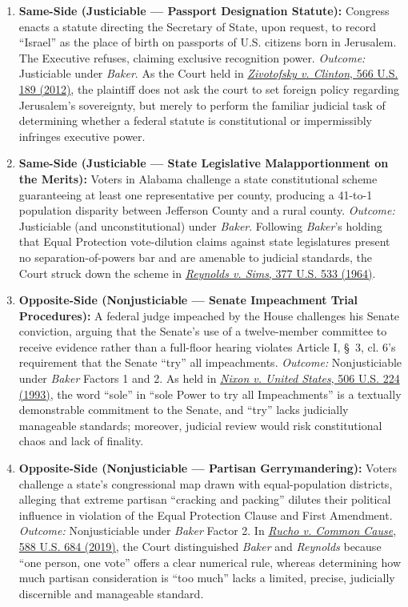 \documentclass[12pt]{article}
\begin{document}
\begin{enumerate}
  \item \textbf{Same-Side (Justiciable --- Passport Designation Statute):} Congress enacts a statute directing the Secretary of State, upon request, to record ``Israel'' as the place of birth on passports of U.S. citizens born in Jerusalem. The Executive refuses, claiming exclusive recognition power. \textit{Outcome:} Justiciable under \textit{Baker}. As the Court held in \href{https://supreme.justia.com/cases/federal/us/566/189/}{\textit{Zivotofsky v. Clinton}, 566 U.S. 189 (2012)}, the plaintiff does not ask the court to set foreign policy regarding Jerusalem's sovereignty, but merely to perform the familiar judicial task of determining whether a federal statute is constitutional or impermissibly infringes executive power.

  \item \textbf{Same-Side (Justiciable --- State Legislative Malapportionment on the Merits):} Voters in Alabama challenge a state constitutional scheme guaranteeing at least one representative per county, producing a 41-to-1 population disparity between Jefferson County and a rural county. \textit{Outcome:} Justiciable (and unconstitutional) under \textit{Baker}. Following \textit{Baker}'s holding that Equal Protection vote-dilution claims against state legislatures present no separation-of-powers bar and are amenable to judicial standards, the Court struck down the scheme in \href{https://supreme.justia.com/cases/federal/us/377/533/}{\textit{Reynolds v. Sims}, 377 U.S. 533 (1964)}.

  \item \textbf{Opposite-Side (Nonjusticiable --- Senate Impeachment Trial Procedures):} A federal judge impeached by the House challenges his Senate conviction, arguing that the Senate's use of a twelve-member committee to receive evidence rather than a full-floor hearing violates Article I, \S~3, cl. 6's requirement that the Senate ``try'' all impeachments. \textit{Outcome:} Nonjusticiable under \textit{Baker} Factors 1 and 2. As held in \href{https://supreme.justia.com/cases/federal/us/506/224/}{\textit{Nixon v. United States}, 506 U.S. 224 (1993)}, the word ``sole'' in ``sole Power to try all Impeachments'' is a textually demonstrable commitment to the Senate, and ``try'' lacks judicially manageable standards; moreover, judicial review would risk constitutional chaos and lack of finality.

  \item \textbf{Opposite-Side (Nonjusticiable --- Partisan Gerrymandering):} Voters challenge a state's congressional map drawn with equal-population districts, alleging that extreme partisan ``cracking and packing'' dilutes their political influence in violation of the Equal Protection Clause and First Amendment. \textit{Outcome:} Nonjusticiable under \textit{Baker} Factor 2. In \href{https://supreme.justia.com/cases/federal/us/588/18-422/}{\textit{Rucho v. Common Cause}, 588 U.S. 684 (2019)}, the Court distinguished \textit{Baker} and \textit{Reynolds} because ``one person, one vote'' offers a clear numerical rule, whereas determining how much partisan consideration is ``too much'' lacks a limited, precise, judicially discernible and manageable standard.


\end{enumerate}
\end{document}
